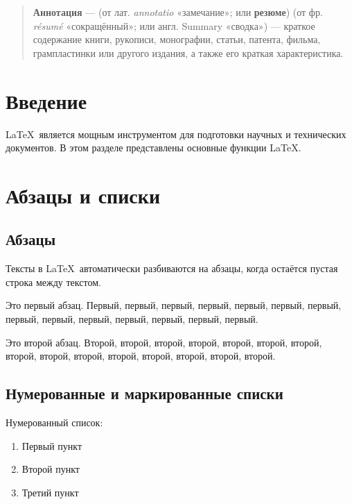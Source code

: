 



\maketitle

\renewcommand{\abstractname}{}
\vspace{-4em}

\begin{abstract}
    \textbf{Аннотация} --- (от лат. \textit{annotatio} «замечание»; или \textbf{резюме}) (от фр. \textit{résumé} «сокращённый»; или англ. Summary «сводка») — краткое содержание книги, рукописи, монографии, статьи, патента, фильма, грампластинки или другого издания, а также его краткая характеристика. 
\end{abstract}

\section*{Введение}
    \LaTeX\ является мощным инструментом для подготовки научных и технических документов. В этом разделе представлены основные функции \LaTeX{}.

\section{Абзацы и списки}

\subsection{Абзацы}
    Тексты в \LaTeX\ автоматически разбиваются на абзацы, когда остаётся пустая строка между текстом.

    Это первый абзац. Первый, первый,  первый,  первый,  первый,  первый,  первый,  первый,  первый,  первый,  первый, первый,  первый, первый.

    Это второй абзац. Второй, второй, второй, второй, второй, второй, второй, второй, второй, второй, второй, второй, второй, второй, второй.
\newpage

\subsection{Нумерованные и маркированные списки}

    Нумерованный список:
    \begin{enumerate}
        \item Первый пункт
        \item Второй пункт
        \item Третий пункт
    \end{enumerate}

